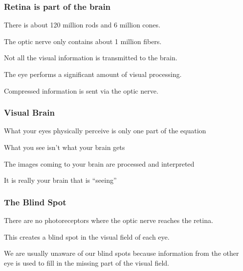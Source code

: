 \documentclass[12pt]{beamer}\usepackage[]{graphicx}\usepackage[]{color}
\begin{document}

\begin{frame}
\frametitle{Retina is part of the brain}

\bbi
  \item There is about 120 million rods and 6 million cones.
  \item The optic nerve only contains about 1 million fibers.
  \item Not all the visual information is transmitted to the brain.
  \item The eye performs a significant amount of visual processing.
  \item Compressed information is sent via the optic nerve.
\ei

\end{frame}


\begin{frame}
\frametitle{Visual Brain}

\bbi
  \item What your eyes physically perceive is only one part of the equation
  \item What you see isn't what your brain gets
  \item The images coming to your brain are processed and interpreted
  \item It is really your brain that is ``seeing''
\ei

\end{frame}


\begin{frame}
\begin{center}
\Huge{}
\end{center}
\end{frame}


\begin{frame}
\frametitle{The Blind Spot}

\bbi
  \item There are no photoreceptors where the optic nerve reaches the retina.
  \item This creates a blind spot in the visual field of each eye.
  
  \item We are usually unaware of our blind spots because information from the 
  other eye is used to fill in the missing part of the visual field.
\ei

\end{frame}
\end{document}
